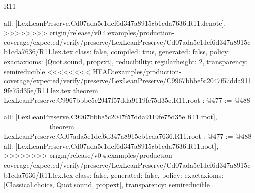\begin{lexlean}{R11}
\begin{coremodule}
{{{{{  all: [LexLeanPreserve.Cd07ada5e1dcf6d347a8915cb1cda7636.R11.denote],
>>>>>>>> origin/release/v0.4:examples/production-coverage/expected/verify/preserve/LexLeanPreserve/Cd07ada5e1dcf6d347a8915cb1cda7636/R11.lex.tex
  class: false,
  compiled: true,
  generated: false,
  policy: exact{axioms: [Quot.sound, propext]},
  reducibility: regular{height: 2},
  transparency: semireducible
}
<<<<<<<< HEAD:examples/production-coverage/expected/verify/preserve/LexLeanPreserve/C9967bbbe5c2047f57dda9119fe75d35e/R11.lex.tex
theorem LexLeanPreserve.C9967bbbe5c2047f57dda9119fe75d35e.R11.root : @477 := @488 {
  all: [LexLeanPreserve.C9967bbbe5c2047f57dda9119fe75d35e.R11.root],
========
theorem LexLeanPreserve.Cd07ada5e1dcf6d347a8915cb1cda7636.R11.root : @477 := @488 {
  all: [LexLeanPreserve.Cd07ada5e1dcf6d347a8915cb1cda7636.R11.root],
>>>>>>>> origin/release/v0.4:examples/production-coverage/expected/verify/preserve/LexLeanPreserve/Cd07ada5e1dcf6d347a8915cb1cda7636/R11.lex.tex
  class: false,
  generated: false,
  policy: exact{axioms: [Classical.choice, Quot.sound, propext]},
  transparency: semireducible
}

}}}}}
\end{coremodule}
\end{lexlean}

